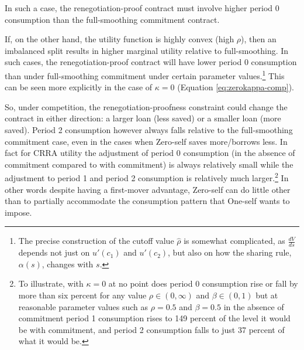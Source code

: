 \documentclass[11pt,english]{article}
\theoremstyle{plain}
\theoremstyle{definition}
\begin{document}
In such a case, the renegotiation-proof contract must involve higher
period 0 consumption than the full-smoothing commitment contract.

If, on the other hand, the utility function is highly convex (high
$\rho$), then an imbalanced split results in higher marginal utility
relative to full-smoothing. In such cases, the renegotiation-proof
contract will have lower period 0 consumption than under full-smoothing
commitment under certain parameter values.\footnote{The precise construction of the cutoff value $\hat{\rho}$ is somewhat
complicated, as $\frac{dV}{ds}$ depends not just on $u'\left(c_{1}\right)$
and $u'\left(c_{2}\right)$, but also on how the sharing rule, $\alpha\left(s\right)$,
changes with $s$.} This can be seen more explicitly in the case of $\kappa=0$ (Equation
\ref{eq:zerokappa-comp}).

So, under competition, the renegotiation-proofness constraint could
change the contract in either direction: a larger loan (less saved)
or a smaller loan (more saved). Period 2 consumption however always
falls relative to the full-smoothing commitment case, even in the
cases when Zero-self saves more/borrows less. In fact for CRRA utility
the adjustment of period 0 consumption (in the absence of commitment
compared to with commitment) is always relatively small while the
adjustment to period 1 and period 2 consumption is relatively much
larger.\footnote{To illustrate, with $\kappa=0$ at no point does period 0 consumption
rise or fall by more than six percent for any value $\rho\in(0,\infty)$
and $\beta\in(0,1)$ but at reasonable parameter values such as $\rho=0.5$
and $\beta=0.5$ in the absence of commitment period 1 consumption
rises to 149 percent of the level it would be with commitment, and
period 2 consumption falls to just 37 percent of what it would be.} In other words despite having a first-mover advantage, Zero-self
can do little other than to partially accommodate the consumption
pattern that One-self wants to impose.
\end{document}
